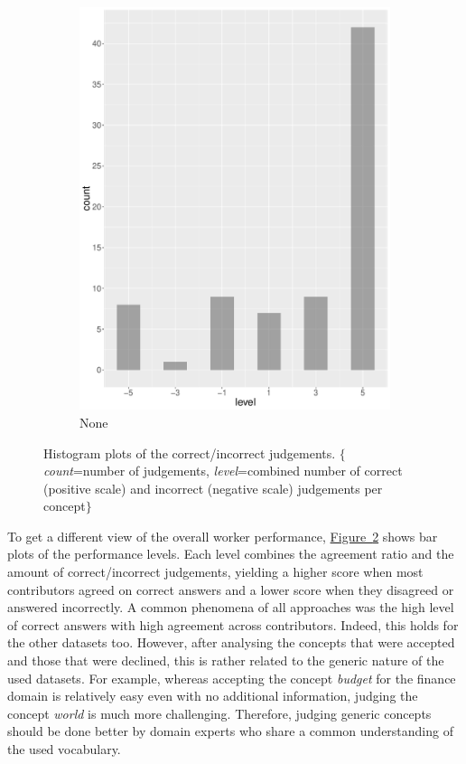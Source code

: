 \begin{figure}
\begin{subfigure}[b]{0.4\textwidth}
        \includegraphics[width=\textwidth]{plots/finance/hist_level_none}
        \caption{None}
        \label{fig:hist_level_finance_none}
    \end{subfigure}
	\caption{Histogram plots of the correct/incorrect judgements. $\{$\emph{count}=number of judgements, \emph{level}=combined number of correct (positive scale) and incorrect (negative scale) judgements per concept$\}$ }
	\label{fig:hist_level_finance_all}
\end{figure}

To get a different view of the overall worker performance, \hyperref[fig:hist_level_finance_all]{Figure~\ref*{fig:hist_level_finance_all}} 
shows bar plots of the performance levels. Each level combines the agreement ratio and the amount of correct/incorrect judgements, yielding a higher score when most contributors agreed on correct answers and a lower score when they disagreed or answered incorrectly.
A common phenomena of all approaches was the high level of correct answers with high agreement across contributors. Indeed, this holds for the other datasets too. However, after analysing the concepts that were accepted and those that were declined, this is rather related to the generic nature of the used datasets. For example, whereas accepting the concept \emph{budget} for the finance domain is relatively easy even with no additional information, judging the concept \emph{world} is much more challenging. Therefore, judging generic concepts should be done better by domain experts who share a common understanding of the used vocabulary. 

